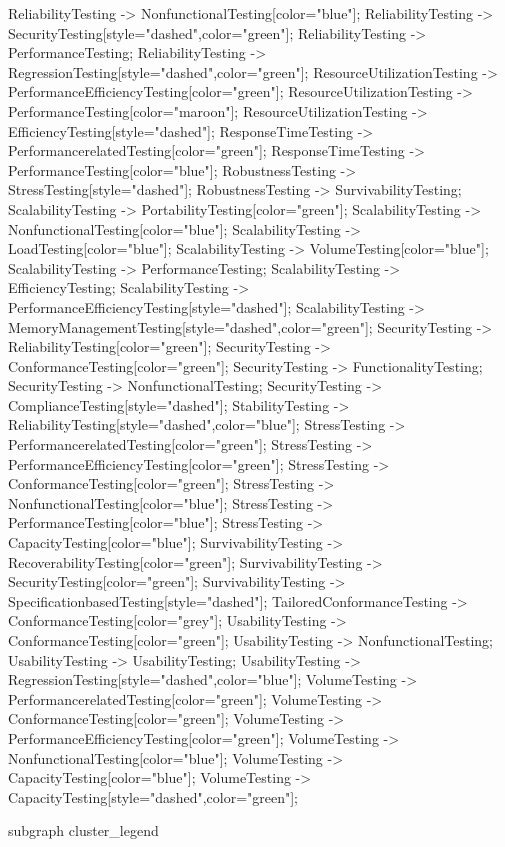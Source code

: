 \documentclass{article}
\begin{document}
{ReliabilityTesting -> NonfunctionalTesting[color="blue"];
ReliabilityTesting -> SecurityTesting[style="dashed",color="green"];
ReliabilityTesting -> PerformanceTesting;
ReliabilityTesting -> RegressionTesting[style="dashed",color="green"];
ResourceUtilizationTesting -> PerformanceEfficiencyTesting[color="green"];
ResourceUtilizationTesting -> PerformanceTesting[color="maroon"];
ResourceUtilizationTesting -> EfficiencyTesting[style="dashed"];
ResponseTimeTesting -> PerformancerelatedTesting[color="green"];
ResponseTimeTesting -> PerformanceTesting[color="blue"];
RobustnessTesting -> StressTesting[style="dashed"];
RobustnessTesting -> SurvivabilityTesting;
ScalabilityTesting -> PortabilityTesting[color="green"];
ScalabilityTesting -> NonfunctionalTesting[color="blue"];
ScalabilityTesting -> LoadTesting[color="blue"];
ScalabilityTesting -> VolumeTesting[color="blue"];
ScalabilityTesting -> PerformanceTesting;
ScalabilityTesting -> EfficiencyTesting;
ScalabilityTesting -> PerformanceEfficiencyTesting[style="dashed"];
ScalabilityTesting -> MemoryManagementTesting[style="dashed",color="green"];
SecurityTesting -> ReliabilityTesting[color="green"];
SecurityTesting -> ConformanceTesting[color="green"];
SecurityTesting -> FunctionalityTesting;
SecurityTesting -> NonfunctionalTesting;
SecurityTesting -> ComplianceTesting[style="dashed"];
StabilityTesting -> ReliabilityTesting[style="dashed",color="blue"];
StressTesting -> PerformancerelatedTesting[color="green"];
StressTesting -> PerformanceEfficiencyTesting[color="green"];
StressTesting -> ConformanceTesting[color="green"];
StressTesting -> NonfunctionalTesting[color="blue"];
StressTesting -> PerformanceTesting[color="blue"];
StressTesting -> CapacityTesting[color="blue"];
SurvivabilityTesting -> RecoverabilityTesting[color="green"];
SurvivabilityTesting -> SecurityTesting[color="green"];
SurvivabilityTesting -> SpecificationbasedTesting[style="dashed"];
TailoredConformanceTesting -> ConformanceTesting[color="grey"];
UsabilityTesting -> ConformanceTesting[color="green"];
UsabilityTesting -> NonfunctionalTesting;
UsabilityTesting -> UsabilityTesting;
UsabilityTesting -> RegressionTesting[style="dashed",color="blue"];
VolumeTesting -> PerformancerelatedTesting[color="green"];
VolumeTesting -> ConformanceTesting[color="green"];
VolumeTesting -> PerformanceEfficiencyTesting[color="green"];
VolumeTesting -> NonfunctionalTesting[color="blue"];
VolumeTesting -> CapacityTesting[color="blue"];
VolumeTesting -> CapacityTesting[style="dashed",color="green"];

subgraph cluster_legend {

}}
\end{document}
